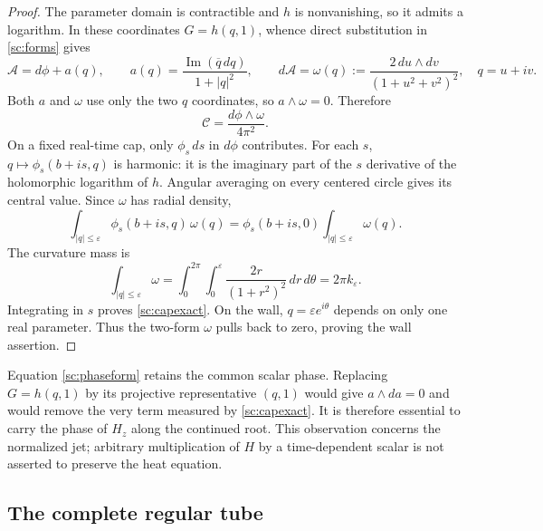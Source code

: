 \begin{proof}
The parameter domain is contractible and $h$ is nonvanishing, so it
admits a logarithm. In these coordinates $G=h(q,1)$, whence direct
substitution in \eqref{sc:forms} gives
\begin{equation}
 \mathcal A=d\phi+a(q),\qquad
 a(q)=\frac{\operatorname{Im}(\overline q\,dq)}{1+|q|^2},\qquad
 d\mathcal A=\omega(q):=
 \frac{2\,du\wedge dv}{(1+u^2+v^2)^2},\quad q=u+iv.
 \label{sc:chartforms}
\end{equation}
Both $a$ and $\omega$ use only the two $q$ coordinates, so
$a\wedge\omega=0$. Therefore
\begin{equation}
 \mathcal C=\frac{d\phi\wedge\omega}{4\pi^2}.
 \label{sc:phaseform}
\end{equation}
On a fixed real-time cap, only $\phi_s\,ds$ in $d\phi$ contributes.
For each $s$, $q\mapsto\phi_s(b+is,q)$ is harmonic: it is the imaginary
part of the $s$ derivative of the holomorphic logarithm of $h$.
Angular averaging on every centered circle gives its central value.
Since $\omega$ has radial density,
\[
 \int_{|q|\le\varepsilon}\phi_s(b+is,q)\,\omega(q)
 =\phi_s(b+is,0)\int_{|q|\le\varepsilon}\omega(q).
\]
The curvature mass is
\[
 \int_{|q|\le\varepsilon}\omega
 =\int_0^{2\pi}\int_0^\varepsilon
       \frac{2r}{(1+r^2)^2}\,dr\,d\theta
 =2\pi k_\varepsilon.
\]
Integrating in $s$ proves \eqref{sc:capexact}. On the wall,
$q=\varepsilon e^{i\theta}$ depends on only one real parameter. Thus
the two-form $\omega$ pulls back to zero, proving the wall assertion.
\end{proof}

Equation \eqref{sc:phaseform} retains the common scalar phase. Replacing
$G=h(q,1)$ by its projective representative $(q,1)$ would give
$a\wedge da=0$ and would remove the very term measured by
\eqref{sc:capexact}. It is therefore essential to carry the phase of
$H_z$ along the continued root. This observation concerns the normalized
jet; arbitrary multiplication of $H$ by a time-dependent scalar is not
asserted to preserve the heat equation.

\subsection{The complete regular tube}
\label{sc:tube}

